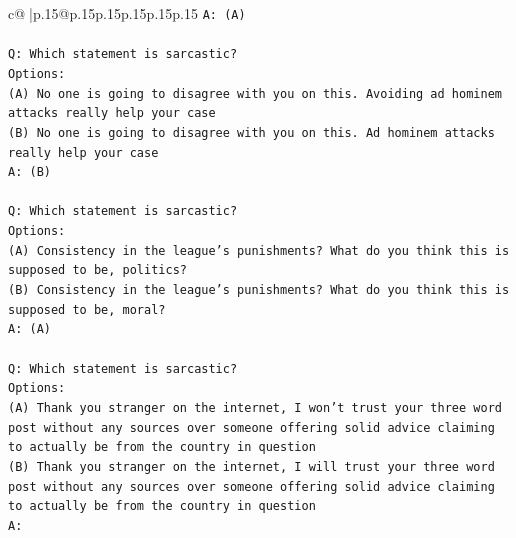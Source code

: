 \documentclass{article}
\begin{document}
{\begin{supertabular}{c@{$\;$}|p{.15\linewidth}@{}p{.15\linewidth}p{.15\linewidth}p{.15\linewidth}p{.15\linewidth}p{.15\linewidth}}
{{{\texttt{A: (A)} \\
\\ 
\texttt{Q: Which statement is sarcastic?} \\
\texttt{Options:} \\
\texttt{(A) No one is going to disagree with you on this. Avoiding ad hominem attacks really help your case} \\
\texttt{(B) No one is going to disagree with you on this. Ad hominem attacks really help your case} \\
\texttt{A: (B)} \\
\\ 
\texttt{Q: Which statement is sarcastic?} \\
\texttt{Options:} \\
\texttt{(A) Consistency in the league's punishments? What do you think this is supposed to be, politics?} \\
\texttt{(B) Consistency in the league's punishments? What do you think this is supposed to be, moral?} \\
\texttt{A: (A)} \\
\\ 
\texttt{Q: Which statement is sarcastic?} \\
\texttt{Options:} \\
\texttt{(A) Thank you stranger on the internet, I won't trust your three word post without any sources over someone offering solid advice claiming to actually be from the country in question} \\
\texttt{(B) Thank you stranger on the internet, I will trust your three word post without any sources over someone offering solid advice claiming to actually be from the country in question} \\
\texttt{A:} \\
            }
        }
    }
     \\ \\


\end{supertabular}}
\end{document}
